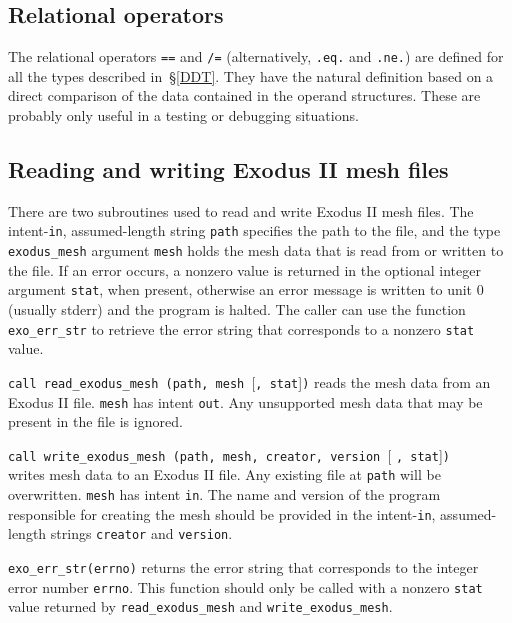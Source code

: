 \documentclass[oneside,12pt]{amsart}
\newenvironment{mydesc}%
  {\begin{list}{}{%
    \setlength{\labelsep}{0pt}%
    \setlength{\itemindent}{-\leftmargin}%
    \setlength{\itemsep}{\parskip}%
    \setlength{\listparindent}{0pt}\setlength{\parsep}{\parskip}}}
  {\end{list}}
\begin{document}
\subsection{Relational operators}
The relational operators \texttt{==} and \texttt{/=} (alternatively,
\texttt{.eq.} and \texttt{.ne.}) are defined for all the types described
in~\S\ref{DDT}.  They have the natural definition based on a direct
comparison of the data contained in the operand structures.
These are probably only useful in a testing or debugging situations. 

\subsection{Reading and writing Exodus II mesh files}
There are two subroutines used to read and write Exodus II mesh files.
The intent-\texttt{in}, assumed-length string \texttt{path} specifies
the path to the file, and the type \texttt{exodus_mesh} argument \texttt{mesh}
holds the mesh data that is read from or written to the file.  
If an error occurs, a nonzero value is returned in the optional integer
argument \texttt{stat}, when present, otherwise an error message is written
to unit 0 (usually stderr) and the program is halted.  The caller can use
the function \texttt{exo_err_str} to retrieve the error string that
corresponds to a nonzero \texttt{stat} value.
\begin{mydesc}
  \item \texttt{call read_exodus_mesh (path, mesh }[\texttt{, stat}]\texttt{)}
  reads the mesh data from an Exodus II file.
  \texttt{mesh} has intent \texttt{out}.
  Any unsupported mesh data that may be present in the file is ignored.
  
\item \texttt{call write_exodus_mesh (path, mesh, creator, version }[%
  \texttt{, stat}]\texttt{)} \\ writes mesh data to an Exodus II file.
  Any existing file at \texttt{path} will be overwritten.
  \texttt{mesh} has intent \texttt{in}.
  The name and version of the program responsible for creating the mesh
  should be provided in the intent-\texttt{in}, assumed-length strings
  \texttt{creator} and \texttt{version}.
    
\item \texttt{exo_err_str(errno)} returns the error string that corresponds
  to the integer error number \texttt{errno}.  This function should only be
  called with a nonzero \texttt{stat} value returned by
  \texttt{read_exodus_mesh} and \texttt{write_exodus_mesh}.
\end{mydesc}
\end{document}
